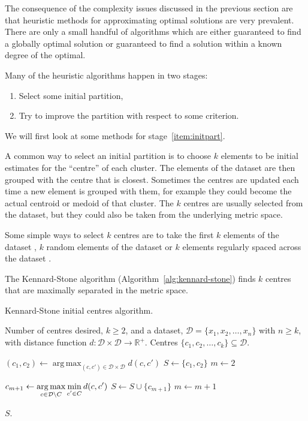 \documentclass[a4paper]{report}
\DeclareMathOperator*{\argmax}{arg\,max}
\newcommand{\dset}{\mathcal{D}}
\begin{document}
The consequence of the complexity issues discussed in the previous section are
that heuristic methods for approximating optimal solutions are very
prevalent.  There are only a small handful of algorithms which are either
guaranteed to find a globally optimal solution or guaranteed to find a
solution within a known degree of the optimal.

Many of the heuristic algorithms happen in two stages:
\begin{enumerate}
\item \label{item:initpart} Select some initial partition,
\item \label{item:improvepart} Try to improve the partition with respect to
  some criterion.
\end{enumerate}
We will first look at some methods for stage~\ref{item:initpart}.

A common way to select an initial partition is to choose $k$ elements to be
initial estimates for the ``centre'' of each cluster.  The elements of the
dataset are then grouped with the centre that is closest.  Sometimes the
centres are updated each time a new element is grouped with them, for example
they could become the actual centroid or medoid of that cluster.  The $k$
centres are usually selected from the dataset, but they could also be taken
from the underlying metric space.

Some simple ways to select $k$ centres are to take the first $k$ elements of
the dataset \citep{macqueen1967some}, $k$ random elements of the dataset
\citep{forgy65cluster} or $k$ elements regularly spaced across the dataset
\citep{beale1969euclidean}.

The Kennard-Stone algorithm (Algorithm~\ref{alg:kennard-stone}) finds $k$
centres that are maximally separated in the metric space.

\begin{algorithm}
  \caption{Kennard-Stone initial centres algorithm.}
  \label{alg:kennard-stone}

  \begin{algorithmic}
    \Require Number of centres desired, $k \geq 2$, and a dataset, $\dset =
             \{x_1,x_2,\dotsc,x_n\}$ with $n \geq k$, with distance function
             $d \colon \dset \times \dset \to \mathbb{R}^+$.
    \Ensure Centres $\{c_1,c_2,\dotsc,c_k\} \subseteq \dset$.

    \State $\displaystyle (c_1,c_2) \gets
            \argmax_{(c,c') \in \dset \times \dset} d(c,c')$
    \State $S \gets \{c_1,c_2\}$
    \State $m \gets 2$

       \State $\displaystyle c_{m+1} \gets
               \argmax_{c \in \dset \setminus C}
               \min_{\raisebox{-.2em}{$\scriptstyle c' \in C$}} d(c,c')$
       \State $S \gets S \cup \{c_{m+1}\}$
       \State $m \gets m+1$
    \EndWhile

    \State \Return $S$.
  \end{algorithmic}
\end{algorithm}
\end{document}
